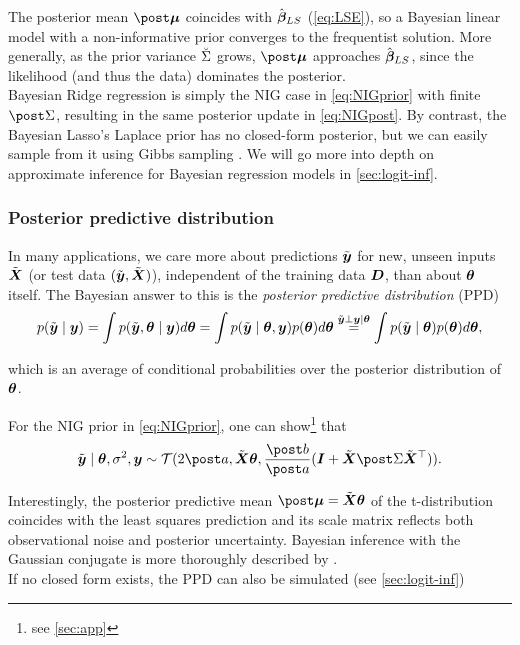 The posterior mean $\mupo$ coincides with $\hat{\bm{\beta}}_{LS}$ (\autoref{eq:LSE}), so a Bayesian linear model with a non-informative prior converges to the frequentist solution.
More generally, as the prior variance $\breve{\Sigma}$ grows, $\mupo$ approaches $\hat{\bm{\beta}}_{LS}$, since the likelihood (and thus the data) dominates the posterior.\\

Bayesian Ridge regression is simply the NIG case in \autoref{eq:NIGprior} with finite $\Sdpo$, resulting in the same posterior update in \autoref{eq:NIGpost}.
By contrast, the Bayesian Lasso's Laplace prior has no closed-form posterior, but we can easily sample from it using Gibbs sampling \citep{park_bayesian_2008}.
We will go more into depth on approximate inference for Bayesian regression models in \autoref{sec:logit-inf}.

\subsubsection*{Posterior predictive distribution}
In many applications, we care more about predictions $\tilde{\bm{y}}$ for new, unseen inputs $\tilde{\bm{X}}$ (or test data $(\tilde{\bm{y}}, \tilde{\bm{X}})$), independent of the training data $\bm{D}$, than about $\bm{\theta}$ itself.
The Bayesian answer to this is the \textit{posterior predictive distribution} (PPD) 
\begin{equation*}
    p(\tilde{\bm{y}} \mid \bm{y}) = \int p(\tilde{\bm{y}}, \bm{\theta} \mid \bm{y}) d \bm{\theta} 
    = \int p(\tilde{\bm{y}} \mid \bm{\theta}, \bm{y}) p(\bm{\theta}) d \bm{\theta}
    \overset{\tilde{\bm{y}} \perp \bm{y} \mid \bm{\theta}}{=}  \int p(\tilde{\bm{y}} \mid \bm{\theta}) p(\bm{\theta}) d \bm{\theta},
\end{equation*}

which is an average of conditional probabilities over the posterior distribution of $\bm{\theta}$.\footnotemark


For the NIG prior in \autoref{eq:NIGprior}, one can show\footnote{see \autoref{sec:app}} that
\begin{equation*}
    \ty \mid \btheta, \ssd, \by \sim \Tcal(2 \apo, \tX \btheta, \frac{\bpo}{\apo} (\bI + \tX \Sdpo \tX^\top)).
\end{equation*}

Interestingly, the posterior predictive mean $\mupo = \tX \btheta$ of the t-distribution coincides with the least squares prediction and its scale matrix reflects both observational noise and posterior uncertainty.
Bayesian inference with the Gaussian conjugate is more thoroughly described by \citet{murphy_conjugate_nodate}.\\

If no closed form exists, the PPD can also be simulated (see \autoref{sec:logit-inf})
